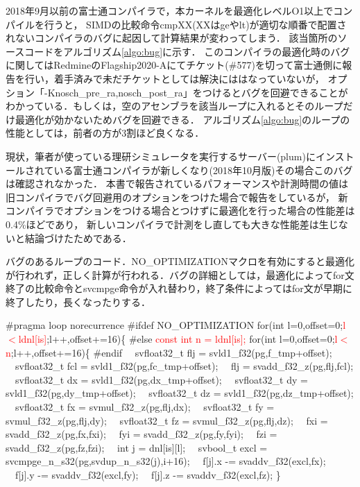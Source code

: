 \documentclass[uplatex,11pt,a4j,titlepage,oneside,openright,dvipdfmx]{jsbook}
\begin{document}
2018年9月以前の富士通コンパイラで，本カーネルを最適化レベルO1以上でコンパイルを行うと，
SIMDの比較命令cmpXX(XXはgeやlt)が適切な順番で配置されないコンパイラのバグに起因して計算結果が変わってしまう．
該当箇所のソースコードをアルゴリズム\ref{algo:bug}に示す．
このコンパイラの最適化時のバグに関してはRedmineのFlagship2020-Aにてチケット(\#577)を切って富士通側に報告を行い，着手済みで未だチケットとしては解決にははなっていないが，
オプション「-Knosch\_pre\_ra,nosch\_post\_ra」をつけるとバグを回避できることがわかっている．もしくは，空のアセンブラを該当ループに入れるとそのループだけ最適化が効かないためバグを回避できる．
アルゴリズム\ref{algo:bug}のループの性能としては，前者の方が3割ほど良くなる．

現状，筆者が使っている理研シミュレータを実行するサーバー(plum)にインストールされている富士通コンパイラが新しくなり(2018年10月版)その場合このバグは確認されなかった．
本書で報告されているパフォーマンスや計測時間の値は旧コンパイラでバグ回避用のオプションをつけた場合で報告をしているが，
新コンパイラでオプションをつける場合とつけずに最適化を行った場合の性能差は0.4\%ほどであり，
新しいコンパイラで計測をし直しても大きな性能差は生じないと結論づけたためである．

\begin{algorithm}
 \caption{バグのあるループのコード．NO\_OPTIMIZATIONマクロを有効にすると最適化が行われず，正しく計算が行われる．バグの詳細としては，最適化によってfor文終了の比較命令とsvcmpge命令が入れ替わり，終了条件によってはfor文が早期に終了したり，長くなったりする．} \label{algo:bug}
  \begin{algorithmic}
   \State \#pragma loop norecurrence
   \State \#ifdef NO\_OPTIMIZATION
   \State for(int l=0,offset=0;\textcolor{red}{l$<$ldnl[is]};l++,offset+=16)\{
   \State \#else
   \State \textcolor{red}{const int n = ldnl[is];}
   \State for(int l=0,offset=0;\textcolor{red}{l$<$n};l++,offset+=16)\{
   \State \#endif
   \State \ \ svfloat32\_t flj = svld1\_f32(pg,f\_tmp+offset);
   \State \ \ svfloat32\_t fcl = svld1\_f32(pg,fc\_tmp+offset);
   \State \ \ flj = svadd\_f32\_z(pg,flj,fcl);
   \State \ \ svfloat32\_t dx = svld1\_f32(pg,dx\_tmp+offset);
   \State \ \ svfloat32\_t dy = svld1\_f32(pg,dy\_tmp+offset);
   \State \ \ svfloat32\_t dz = svld1\_f32(pg,dz\_tmp+offset);
   \State \ \ svfloat32\_t fx = svmul\_f32\_z(pg,flj,dx);
   \State \ \ svfloat32\_t fy = svmul\_f32\_z(pg,flj,dy);
   \State \ \ svfloat32\_t fz = svmul\_f32\_z(pg,flj,dz);
   \State \ \ fxi = svadd\_f32\_z(pg,fx,fxi);
   \State \ \ fyi = svadd\_f32\_z(pg,fy,fyi);
   \State \ \ fzi = svadd\_f32\_z(pg,fz,fzi);
   \State \ \ int j = dnl[is][l];
   \State \ \ svbool\_t excl = svcmpge\_n\_s32(pg,svdup\_n\_s32(j),i+16);
   \State \ \ f[j].x -= svaddv\_f32(excl,fx);
   \State \ \ f[j].y -= svaddv\_f32(excl,fy);
   \State \ \ f[j].z -= svaddv\_f32(excl,fz);
   \State \}
  \end{algorithmic}
\end{algorithm}
\end{document}
